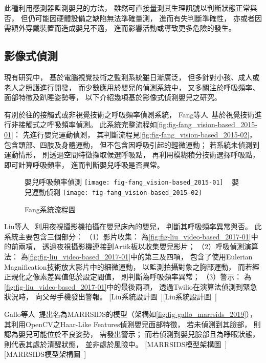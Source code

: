 \documentclass[class=NCU_thesis, crop=false]{standalone}
\begin{document}
此種利用感測器監測嬰兒的方法，
雖然可直接量測其生理訊號以判斷狀態正常與否，
但仍可能因硬體設備之缺陷無法準確量測，
進而有失判斷準確性，
亦或者因需額外穿戴裝置而造成嬰兒不適，
進而影響活動或導致更多危險的發生。

\subsection{影像式偵測}
現有研究中，
基於電腦視覺技術之監測系統雖日漸廣泛，
但多針對小孩、成人或老人之照護進行開發，
而少數應用於嬰兒的偵測系統中，
又多關注於呼吸頻率、面部特徵及趴睡姿勢等，
以下介紹幾項基於影像式偵測嬰兒之研究。

有別於往的接觸式或非視覺技術之呼吸頻率偵測系統，
Fang等人~\cite{fang_vision-based_2015}基於視覺技術進行非接觸式之呼吸頻率偵測。
此系統完整流程如\cref{fig:fig-fang_vision-based_2015-01}：
先進行嬰兒運動偵測，
其判斷流程見\cref{fig:fig-fang_vision-based_2015-02}，
包含頭部、四肢及身體運動，
但不包含因呼吸引起的輕微運動；
若系統未偵測到運動情形，
則透過空間特徵擷取候選呼吸點，
再利用模糊積分技術選擇呼吸點，
即可計算呼吸頻率，
進而判斷嬰兒呼吸是否異常。
\begin{figure}[!hbt]
    \centering
    \subcaptionbox
        {嬰兒呼吸頻率偵測
        \label{fig:fig-fang_vision-based_2015-01}}
        {\texttt{[image: fig-fang\_vision-based\_2015-01]}}
    ~
    \subcaptionbox
        {嬰兒運動偵測
        \label{fig:fig-fang_vision-based_2015-02}}
        {\texttt{[image: fig-fang\_vision-based\_2015-02]}}
    \caption{Fang系統流程圖~\cite{fang_vision-based_2015}}
    \label{fig:fig-fang_vision-based_2015}
\end{figure}

Liu等人~\cite{liu_video-based_2017}
利用夜視攝影機拍攝在嬰兒床內的嬰兒，
判斷其呼吸頻率異常與否。
此系統主要包含三個部分：
（1）影片收集：
為\cref{fig:fig-liu_video-based_2017-01}中的前兩項，
透過夜視攝影機連接到Artik板以收集嬰兒影片；
（2）呼吸偵測演算法：
為\cref{fig:fig-liu_video-based_2017-01}中的第三及四項，
包含了使用Eulerian Magnification技術放大影片中的細微運動，
以監測拍攝對象之胸部運動，
而若經正規化之像素差異值低於設定閥值，
則判斷為呼吸頻率異常；
（3）警示：
為\cref{fig:fig-liu_video-based_2017-01}中的最後兩項，
透過Twilio在演算法偵測到緊急狀況時，
向父母手機發出警報。
[Liu系統設計圖~\cite{liu_video-based_2017}][Liu系統設計圖~\cite{liu_video-based_2017}]

Gallo等人~\cite{gallo_marrsids_2019}提出名為MARRSIDS的模型（架構如\cref{fig:fig-gallo_marrsids_2019}），
其利用OpenCV之Haar-Like Features偵測嬰兒面部特徵，
若未偵測到其臉部，
則認為嬰兒可能位於不良姿勢，
需發出警示；
而若偵測到嬰兒臉部且為睜眼狀態，
則代表其處於清醒狀態，
並非處於風險中。
[MARRSIDS模型架構圖~\cite{gallo_marrsids_2019}][MARRSIDS模型架構圖~\cite{gallo_marrsids_2019}]
\end{document}
